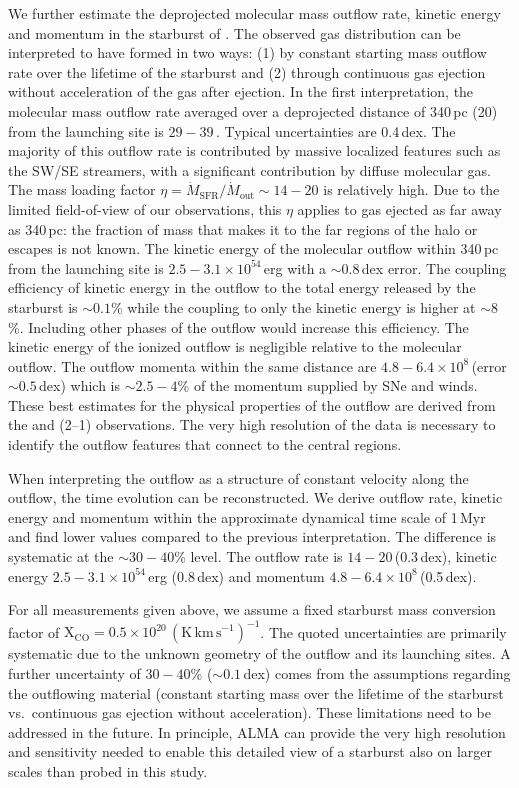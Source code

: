 We further estimate the deprojected molecular mass outflow rate, kinetic energy and momentum in the starburst of . The observed gas distribution can be interpreted to have formed in two ways: (1) by constant starting mass outflow rate over the lifetime of the starburst and (2) through continuous gas ejection without acceleration of the gas after ejection. In the first interpretation, the molecular mass outflow rate averaged over a deprojected distance of 340\,pc (20\arcsec) from the launching site is $29-39$\,\Msunyr. Typical uncertainties are 0.4\,dex. The majority of this outflow rate is contributed by massive localized features such as the SW/SE streamers, with a significant contribution by diffuse molecular gas. The mass loading factor $\eta=\dot{M}_\mathrm{SFR}/\dot{M}_\mathrm{out}\sim14-20$ is relatively high. Due to the limited field-of-view of our observations, this $\eta$ applies to gas ejected as far away as 340\,pc: the fraction of mass that makes it to the far regions of the halo or escapes is not known. 
The kinetic energy of the molecular outflow within 340\,pc from the launching site is $2.5-3.1 \times 10^{54}$\,erg with a $\sim 0.8$\,dex error. The coupling efficiency of kinetic energy in the outflow to the total energy released by the starburst is $\sim 0.1$\% while the coupling to only the kinetic energy is higher at $\sim 8$\%. Including other phases of the outflow would increase this efficiency. The kinetic energy of the ionized outflow is negligible relative to the molecular outflow.
The outflow momenta within the same distance are $4.8-6.4 \times 10^8$\,\Msunkms (error $\sim 0.5$\,dex) which is $\sim 2.5-4$\% of the momentum supplied by SNe and winds. 
These best estimates for the physical properties of the outflow are derived from the  and (2--1) observations. The very high resolution of the  data is necessary to identify the outflow features that connect to the central regions.

When interpreting the outflow as a structure of constant velocity along the outflow, the time evolution can be reconstructed. We derive outflow rate, kinetic energy and momentum within the approximate dynamical time scale of 1\,Myr and find lower values compared to the previous interpretation. The difference is systematic at the $\sim 30-40$\% level. The outflow rate is $14-20$\,\Msunyr (0.3\,dex), kinetic energy $2.5-3.1 \times 10^{54}$\,erg (0.8\,dex) and momentum $4.8-6.4 \times 10^8$\,\Msunkms (0.5\,dex). 

For all measurements given above, we assume a fixed starburst mass conversion factor of $\mathrm{X}_{\mathrm{CO}} = 0.5\times10^{20}\,\left(\mathrm{K\,km\,s}^{-1}\right)^{-1}$. The quoted uncertainties are primarily systematic due to the unknown geometry of the outflow and its launching sites. A further uncertainty of $30-40$\% ($\sim 0.1$\,dex) comes from the assumptions regarding the outflowing material (constant starting mass over the lifetime of the starburst  vs.\  continuous gas ejection without acceleration). These limitations need to be addressed in the future. In principle, ALMA can provide the very high resolution and sensitivity needed to enable this detailed view of a starburst also on larger scales than probed in this study.



